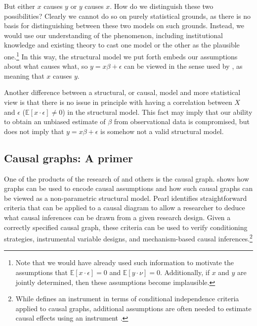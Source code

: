 \documentclass[11pt]{amsart}
\begin{document}
But either $x$ causes $y$ or $y$ causes $x$. 
How do we distinguish these two possibilities?
Clearly we cannot do so on purely statistical grounds, as there is no basis for distinguishing between these two models on such grounds.
Instead, we would use our understanding of the phenomenon, including institutional knowledge and existing theory to cast one model or the other as the plausible one.\footnote{
Note that we would have already used such information to motivate the assumptions that $\mathbb{E}[x \cdot \epsilon] = 0$ and $\mathbb{E}[y \cdot \nu] = 0$.
Additionally, if $x$ and $y$ are jointly determined, then these assumptions become implausible.}
In this way, the structural model we put forth embeds our assumptions about what causes what, so $y = x \beta + \epsilon$ can be viewed in the sense used by \citep[p.979]{Goldberger:1972cq}, as meaning that $x$ causes $y$.

Another difference between a structural, or causal, model and more statistical view is that there is no issue in principle with having a correlation between $X$ and $\epsilon$ ($\mathbb{E} [x \cdot \epsilon] \neq 0$) in the structural model.
This fact may imply that our ability to obtain an unbiased estimate of $\beta$ from observational data is compromised, but does not imply that $y = x \beta + \epsilon$ is somehow not a valid structural model.

\subsection{Causal graphs: A primer}
One of the products of the research of \citet{Pearl:2009kh} and others is the causal graph.
\citet{Pearl:2009kh} shows how graphs can be used to encode causal assumptions and how such causal graphs can be viewed as a non-parametric structural model.
Pearl identifies straightforward criteria that can be applied to a causal diagram to allow a researcher to deduce what causal inferences can be drawn from a given research design.
Given a correctly specified causal graph, these criteria can be used to verify conditioning strategies, instrumental variable designs, and mechanism-based causal inferences.\footnote{While \citet[p.248]{Pearl:2009kh} defines an instrument in terms of conditional independence criteria applied to causal graphs, additional assumptions are often needed to estimate causal effects using an instrument \citep{Angrist:1996p7456}.}
\end{document}
